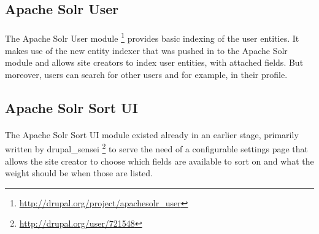 \subsection{Apache Solr User}
\paragraph{}The Apache Solr User module \footnote{\url{http://drupal.org/project/apachesolr_user}} provides basic indexing of the user entities. It makes use of the new entity indexer that was pushed in to the Apache Solr module and allows site creators to index user entities, with attached fields. But moreover, users can search for other users and for example, in their profile.

\subsection{Apache Solr Sort UI}
\paragraph{} The Apache Solr Sort UI module existed already in an earlier stage, primarily written by drupal\_sensei \footnote{\url{http://drupal.org/user/721548}} to serve the need of a configurable settings page that allows the site creator to choose which fields are available to sort on and what the weight should be when those are listed. 